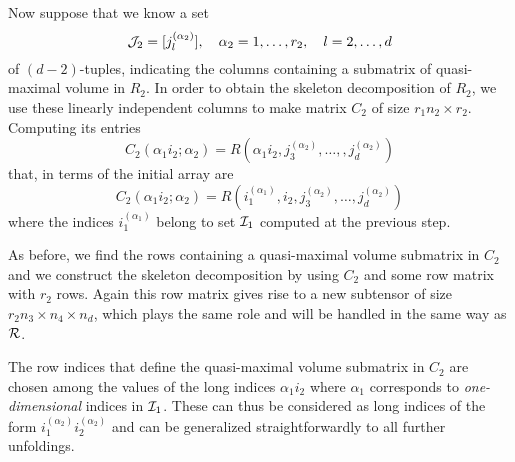 Now suppose that we know a set
\begin{equation*}
  \mathcal{J}_2 = [j_l^{(\alpha_2)}], \quad \alpha_2 = 1,\ldots,r_2, \quad l = 2,\ldots,d
\end{equation*}
of $(d-2)$-tuples, indicating the columns containing a submatrix of quasi-maximal volume in $R_2$. In order to obtain the skeleton decomposition of $R_2$, we use these linearly independent columns to make matrix $C_2$ of size $r_1 n_2 \times r_2$. Computing its entries
\begin{equation*}
  C_2(\alpha_1 i_2; \alpha_2) = R(\alpha_1 i_2,j_3^{(\alpha_2)},\ldots,,j_d^{(\alpha_2)})
\end{equation*}
that, in terms of the initial array are
\begin{equation*}
  C_2(\alpha_1 i_2; \alpha_2) = R(i_1^{(\alpha_1)},i_2,j_3^{(\alpha_2)},\ldots,j_d^{(\alpha_2)})
\end{equation*}
where the indices $i_1^{(\alpha_1)}$ belong to set $\mathcal{I}_1$ computed at the previous step.

As before, we find the rows containing a quasi-maximal volume submatrix in $C_2$ and we construct the skeleton decomposition by using $C_2$ and some row matrix with $r_2$ rows. Again this row matrix gives rise to a new subtensor of size $r_2n_3 \times n_4 \times n_d$, which plays the same role and will be handled in the same way as $\mathcal{R}$.

The row indices that define the quasi-maximal volume submatrix in $C_2$ are chosen among the values of the long indices $\alpha_1i_2$ where $\alpha_1$ corresponds to \emph{one-dimensional} indices in $\mathcal{I}_1$. These can thus be considered as long indices of the form $i_1^{(\alpha_2)}i_2^{(\alpha_2)}$ and can be generalized straightforwardly to all further unfoldings.

